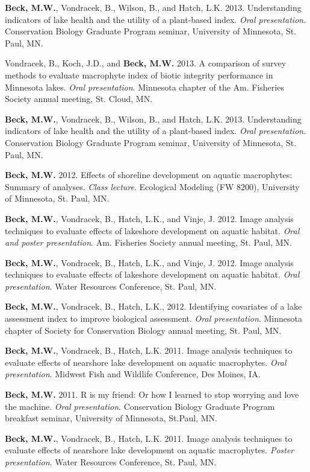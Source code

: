 \documentclass[letterpaper,12pt]{article}
\begin{document}
{\bf Beck, M.W.}, Vondracek, B., Wilson, B., and Hatch, L.K. 2013. Understanding indicators of lake health and the utility of a plant-based index. \textit{Oral presentation}. Conservation Biology Graduate Program seminar, University of Minnesota, St. Paul, MN.

Vondracek, B., Koch, J.D., and {\bf Beck, M.W.} 2013. A comparison of survey methods to evaluate macrophyte index of biotic integrity performance in Minnesota lakes. \textit{Oral presentation}. Minnesota chapter of the Am. Fisheries Society annual meeting, St. Cloud, MN.

{\bf Beck, M.W.}, Vondracek, B., Wilson, B., and Hatch, L.K. 2013. Understanding indicators of lake health and the utility of a plant-based index. \textit{Oral presentation}. Conservation Biology Graduate Program seminar, University of Minnesota, St. Paul, MN.

{\bf Beck, M.W.} 2012. Effects of shoreline development on aquatic macrophytes: Summary of analyses. \textit{Class lecture}. Ecological Modeling (FW 8200), University of Minnesota, St. Paul, MN.

{\bf Beck, M.W.}, Vondracek, B., Hatch, L.K., and Vinje, J. 2012. Image analysis techniques to evaluate effects of lakeshore development on aquatic habitat. \textit{Oral and poster presentation}. Am. Fisheries Society annual meeting, St. Paul, MN.

{\bf Beck, M.W.}, Vondracek, B., Hatch, L.K., and Vinje, J. 2012. Image analysis techniques to evaluate effects of lakeshore development on aquatic habitat. \textit{Oral presentation}. Water Resources Conference, St. Paul, MN.

{\bf Beck, M.W.}, Vondracek, B., Hatch, L.K., 2012. Identifying covariates of a lake assessment index to improve biological assessment. \textit{Oral presentation}. Minnesota chapter of Society for Conservation Biology annual meeting, St. Paul, MN.

{\bf Beck, M.W.}, Vondracek, B., Hatch, L.K. 2011. Image analysis techniques to evaluate effects of nearshore lake development on aquatic macrophytes. \textit{Oral presentation}. Midwest Fish and Wildlife Conference, Des Moines, IA.

{\bf Beck, M.W.} 2011. R is my friend: Or how I learned to stop worrying and love the machine. \textit{Oral presentation}. Conservation Biology Graduate Program breakfast seminar, University of Minnesota, St.Paul, MN.

{\bf Beck, M.W.}, Vondracek, B., Hatch, L.K. 2011. Image analysis techniques to evaluate effects of nearshore lake development on aquatic macrophytes. \textit{Poster presentation}. Water Resources Conference, St. Paul, MN.
\end{document}

